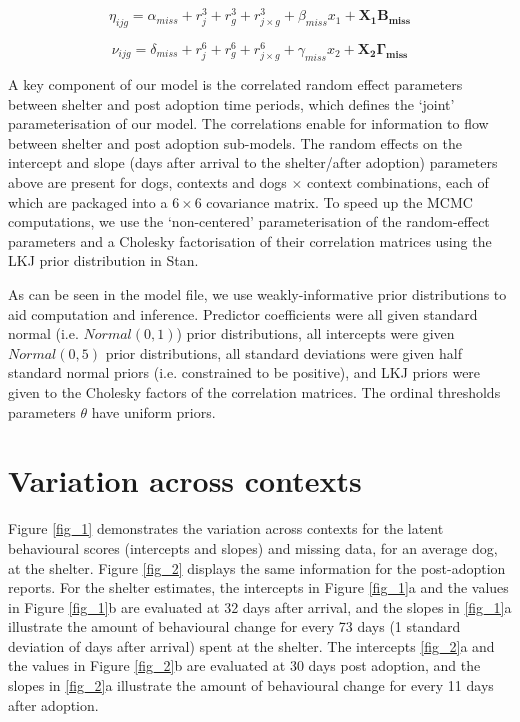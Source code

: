 \documentclass[12pt]{article}
\begin{document}
\begin{equation}
  \eta_{ijg} = \alpha_{miss} + r_{j}^{3} + r_{g}^{3} + r_{j \times g}^{3} +
               \beta_{miss} x_{1} + \mathbf{X_{1}} \mathbf{B_{miss}}
\end{equation}

\begin{equation}
  \nu_{ijg} = \delta_{miss} + r_{j}^{6} + r_{g}^{6} + r_{j \times g}^{6} +
               \gamma_{miss} x_{2} + \mathbf{X_{2}} \mathbf{\Gamma_{miss}}
\end{equation}

A key component of our model is the correlated random effect parameters between shelter and post adoption time periods, which defines the `joint' parameterisation of our model. The correlations enable for information to flow between shelter and post adoption sub-models. The random effects on the intercept and slope (days after arrival to the shelter/after adoption) parameters above are present for dogs, contexts and dogs $\times$ context combinations, each of which are packaged into a $6 \times 6$ covariance matrix. To speed up the MCMC computations, we use the `non-centered' parameterisation of the random-effect parameters and a Cholesky factorisation of their correlation matrices using the LKJ prior distribution in Stan.

As can be seen in the model file, we use weakly-informative prior distributions to aid computation and inference. Predictor coefficients were all given standard normal (i.e. $Normal(0, 1)$) prior distributions, all intercepts were given $Normal(0, 5)$ prior distributions, all standard deviations were given half standard normal priors (i.e. constrained to be positive), and LKJ priors were given to the Cholesky factors of the correlation matrices. The ordinal thresholds parameters $\theta$ have uniform priors. 

\newpage
\section{Variation across contexts}
Figure \ref{fig_1} demonstrates the variation across contexts for the latent behavioural scores (intercepts and slopes) and missing data, for an average dog, at the shelter. Figure \ref{fig_2} displays the same information for the post-adoption reports. For the shelter estimates, the intercepts in Figure \ref{fig_1}a and the values in Figure \ref{fig_1}b are evaluated at 32 days after arrival, and the slopes in \ref{fig_1}a illustrate the amount of behavioural change for every 73 days (1 standard deviation of days after arrival) spent at the shelter. The intercepts \ref{fig_2}a and the values in Figure \ref{fig_2}b are evaluated at 30 days post adoption, and the slopes in \ref{fig_2}a illustrate the amount of behavioural change for every 11 days after adoption.
\end{document}

